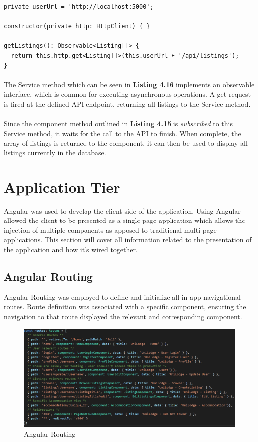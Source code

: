 \begin{lstlisting}[caption=Service Method for Retrieving all Listings]
private userUrl = 'http://localhost:5000'; 

constructor(private http: HttpClient) { }

getListings(): Observable<Listing[]> {
  return this.http.get<Listing[]>(this.userUrl + '/api/listings');
}
\end{lstlisting}

\paragraph{}
The Service method which can be seen in \textbf{Listing 4.16} implements an observable interface, which is common for executing asynchronous operations. A get request is fired at the defined API endpoint, returning all listings to the Service method. 

\paragraph{}
Since the component method outlined in \textbf{Listing 4.15} is \textit{subscribed} to this Service method, it waits for the call to the API to finish. When complete, the array of listings is returned to the component, it can then be used to display all listings currently in the database.

\section{Application Tier}
Angular was used to develop the client side of the application. Using Angular allowed the client to be presented as a single-page application which allows the injection of multiple components as apposed to traditional multi-page applications. This section will cover all information related to the presentation of the application and how it's wired together.

\subsection{Angular Routing}
Angular Routing was employed to define and initialize all in-app navigational routes. Route definition was associated with a specific component, ensuring the navigation to that route displayed the relevant and corresponding component.

\begin{figure}[H]
	\caption{Angular Routing}
	\label{image:routing}
	\centering
	\includegraphics[width=1\textwidth]{images/routes.png}
\end{figure}

